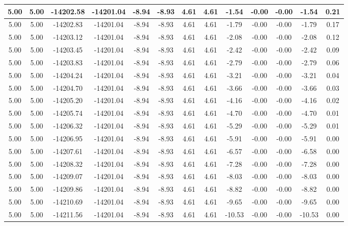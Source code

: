 \begin{table}[htbp]
\begin{adjustbox}{angle=90}
\begin{tabular}{|c|c|c|c|c|c|c|c|c|c|c|c|c|}
 5.00 & 5.00 & -14202.58 & -14201.04 & -8.94 & -8.93 & 4.61 & 4.61 & -1.54 & -0.00 & -0.00 & -1.54 & 0.21\\ \hline
 5.00 & 5.00 & -14202.83 & -14201.04 & -8.94 & -8.93 & 4.61 & 4.61 & -1.79 & -0.00 & -0.00 & -1.79 & 0.17\\ \hline
 5.00 & 5.00 & -14203.12 & -14201.04 & -8.94 & -8.93 & 4.61 & 4.61 & -2.08 & -0.00 & -0.00 & -2.08 & 0.12\\ \hline
 5.00 & 5.00 & -14203.45 & -14201.04 & -8.94 & -8.93 & 4.61 & 4.61 & -2.42 & -0.00 & -0.00 & -2.42 & 0.09\\ \hline
 5.00 & 5.00 & -14203.83 & -14201.04 & -8.94 & -8.93 & 4.61 & 4.61 & -2.79 & -0.00 & -0.00 & -2.79 & 0.06\\ \hline
 5.00 & 5.00 & -14204.24 & -14201.04 & -8.94 & -8.93 & 4.61 & 4.61 & -3.21 & -0.00 & -0.00 & -3.21 & 0.04\\ \hline
 5.00 & 5.00 & -14204.70 & -14201.04 & -8.94 & -8.93 & 4.61 & 4.61 & -3.66 & -0.00 & -0.00 & -3.66 & 0.03\\ \hline
 5.00 & 5.00 & -14205.20 & -14201.04 & -8.94 & -8.93 & 4.61 & 4.61 & -4.16 & -0.00 & -0.00 & -4.16 & 0.02\\ \hline
 5.00 & 5.00 & -14205.74 & -14201.04 & -8.94 & -8.93 & 4.61 & 4.61 & -4.70 & -0.00 & -0.00 & -4.70 & 0.01\\ \hline
 5.00 & 5.00 & -14206.32 & -14201.04 & -8.94 & -8.93 & 4.61 & 4.61 & -5.29 & -0.00 & -0.00 & -5.29 & 0.01\\ \hline
 5.00 & 5.00 & -14206.95 & -14201.04 & -8.94 & -8.93 & 4.61 & 4.61 & -5.91 & -0.00 & -0.00 & -5.91 & 0.00\\ \hline
 5.00 & 5.00 & -14207.61 & -14201.04 & -8.94 & -8.93 & 4.61 & 4.61 & -6.57 & -0.00 & -0.00 & -6.58 & 0.00\\ \hline
 5.00 & 5.00 & -14208.32 & -14201.04 & -8.94 & -8.93 & 4.61 & 4.61 & -7.28 & -0.00 & -0.00 & -7.28 & 0.00\\ \hline
 5.00 & 5.00 & -14209.07 & -14201.04 & -8.94 & -8.93 & 4.61 & 4.61 & -8.03 & -0.00 & -0.00 & -8.03 & 0.00\\ \hline
 5.00 & 5.00 & -14209.86 & -14201.04 & -8.94 & -8.93 & 4.61 & 4.61 & -8.82 & -0.00 & -0.00 & -8.82 & 0.00\\ \hline
 5.00 & 5.00 & -14210.69 & -14201.04 & -8.94 & -8.93 & 4.61 & 4.61 & -9.65 & -0.00 & -0.00 & -9.65 & 0.00\\ \hline
 5.00 & 5.00 & -14211.56 & -14201.04 & -8.94 & -8.93 & 4.61 & 4.61 & -10.53 & -0.00 & -0.00 & -10.53 & 0.00\\ \hline

\end{tabular}
\end{adjustbox}
\end{table}
